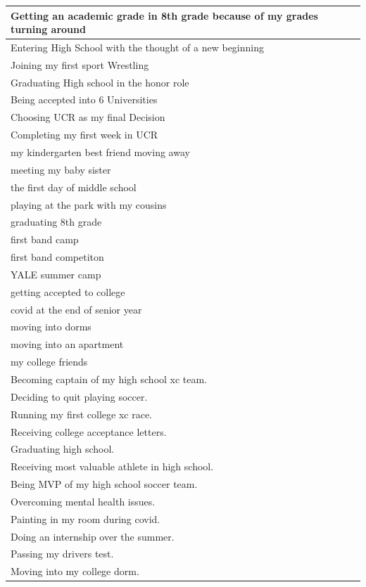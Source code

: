 \documentclass[
  .7em,
  letterpaper,
  DIV=11,
  numbers=noendperiod]{scrartcl}
\begin{document}
\begin{table}
\begin{tabular}{l}
\hline
Getting an academic grade in 8th grade because of my grades turning around\\
\hline
Entering High School with the thought of a new beginning\\
\hline
Joining  my first sport Wrestling\\
\hline
Graduating High school in the honor role\\
\hline
Being accepted into 6 Universities\\
\hline
Choosing UCR as my final Decision\\
\hline
Completing my first week in UCR\\
\hline
my kindergarten best friend moving away\\
\hline
meeting my baby sister\\
\hline
the first day of middle school\\
\hline
playing at the park with my cousins\\
\hline
graduating 8th grade\\
\hline
first band camp\\
\hline
first band competiton\\
\hline
YALE summer camp\\
\hline
getting accepted to college\\
\hline
covid at the end of senior year\\
\hline
moving into dorms\\
\hline
moving into an apartment\\
\hline
my college friends\\
\hline
Becoming captain of my high school xc team.\\
\hline
Deciding to quit playing soccer.\\
\hline
Running my first college xc race.\\
\hline
Receiving college acceptance letters.\\
\hline
Graduating high school.\\
\hline
Receiving most valuable athlete in high school.\\
\hline
Being MVP of my high school soccer team.\\
\hline
Overcoming mental health issues.\\
\hline
Painting in my room during covid.\\
\hline
Doing an internship over the summer.\\
\hline
Passing my drivers test.\\
\hline
Moving into my college dorm.\\

\end{tabular}
\end{table}
\end{document}

